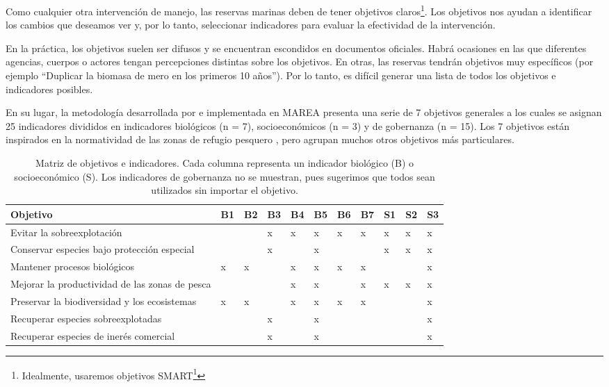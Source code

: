 \documentclass[]{krantz}
\renewcommand{\href}[2]{#2\footnote{\url{#1}}}
\begin{document}
Como cualquier otra intervención de manejo, las reservas marinas deben de tener objetivos claros\footnote{Idealmente, usaremos objetivos \href{https://en.wikipedia.org/wiki/SMART_criteria}{SMART}}. Los objetivos nos ayudan a identificar los cambios que deseamos ver y, por lo tanto, seleccionar indicadores para evaluar la efectividad de la intervención.

En la práctica, los objetivos suelen ser difusos y se encuentran escondidos en documentos oficiales. Habrá ocasiones en las que diferentes agencias, cuerpos o actores tengan percepciones distintas sobre los objetivos. En otras, las reservas tendrán objetivos muy específicos (por ejemplo ``Duplicar la biomasa de mero en los primeros 10 años''). Por lo tanto, es difícil generar una lista de todos los objetivos e indicadores posibles.

En su lugar, la metodología desarrollada por \citet{villasenorderbez_2018} e implementada en MAREA presenta una serie de 7 objetivos generales a los cuales se asignan 25 indicadores divididos en indicadores biológicos (n = 7), socioeconómicos (n = 3) y de gobernanza (n = 15). Los 7 objetivos están inspirados en la normatividad de las zonas de refugio pesquero \citep{nom}, pero agrupan muchos otros objetivos más particulares.

\begin{table}[t]

\caption{\label{tab:tabla-oi}Matriz de objetivos e indicadores. Cada columna representa un indicador biológico (B) o socioeconómico (S). Los indicadores de gobernanza no se muestran, pues sugerimos que todos sean utilizados sin importar el objetivo.}
\centering
\begin{tabular}{lllllllllll}
\toprule
Objetivo & B1 & B2 & B3 & B4 & B5 & B6 & B7 & S1 & S2 & S3\\
\midrule
Evitar la sobreexplotación &  &  & x & x & x & x & x & x & x & x\\
Conservar especies bajo protección especial &  &  & x &  & x &  &  & x & x & x\\
Mantener procesos biológicos & x & x &  & x & x & x & x &  &  & x\\
Mejorar la productividad de las zonas de pesca &  &  &  & x & x &  & x & x & x & x\\
Preservar la biodiversidad y los ecosistemas & x & x &  & x & x & x & x &  &  & x\\
\addlinespace
Recuperar especies sobreexplotadas &  &  & x &  & x &  &  &  &  & x\\
Recuperar especies de inerés comercial &  &  & x &  & x &  &  &  &  & x\\
\bottomrule
\end{tabular}
\end{table}
\end{document}

